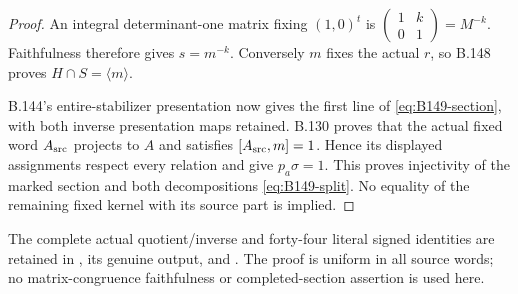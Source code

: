 \begin{proof}
An integral determinant-one matrix fixing $(1,0)^t$ is
$\left(\begin{smallmatrix}1&k\\0&1\end{smallmatrix}\right)=M^{-k}$.
Faithfulness therefore gives $s=m^{-k}$. Conversely $m$ fixes the
actual $r$, so B.148 proves $H\cap S=\langle m\rangle$.

B.144's entire-stabilizer presentation now gives the first line of
\eqref{eq:B149-section}, with both inverse presentation maps retained.
B.130 proves that the actual fixed word $A_{\rm src}$ projects to $A$
and satisfies $[A_{\rm src},m]=1$. Hence its displayed assignments
respect every relation and give $p_a\sigma=1$. This proves injectivity
of the marked section and both decompositions \eqref{eq:B149-split}.
No equality of the remaining fixed kernel with its source part is
implied.
\end{proof}
The complete actual quotient/inverse and forty-four literal signed
identities are retained in
,
its genuine output, and
.
The proof is uniform in all source words; no matrix-congruence
faithfulness or completed-section assertion is used here.
